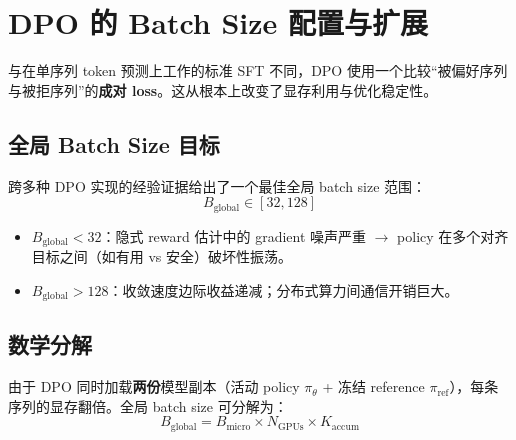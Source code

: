 \section{DPO 的 Batch Size 配置与扩展}
\label{dpo-batch-size-configuration-and-scaling}

与在单序列 token 预测上工作的标准 SFT 不同，DPO 使用一个比较“被偏好序列与被拒序列”的\textbf{成对 loss}。这从根本上改变了显存利用与优化稳定性。

\subsection{全局 Batch Size 目标}
\label{global-batch-size-target}

跨多种 DPO 实现的经验证据给出了一个最佳全局 batch size 范围：
\begin{equation}
\boxed{B_{\text{global}} \in [32, 128]}
\end{equation}

\begin{itemize}
  \item $B_{\text{global}} < 32$：隐式 reward 估计中的 gradient 噪声严重 $\rightarrow$ policy 在多个对齐目标之间（如有用 vs 安全）破坏性振荡。
  \item $B_{\text{global}} > 128$：收敛速度边际收益递减；分布式算力间通信开销巨大。
\end{itemize}

\subsection{数学分解}
\label{mathematical-decomposition}

由于 DPO 同时加载\textbf{两份}模型副本（活动 policy $\pi_\theta$ + 冻结 reference $\pi_{\text{ref}}$），每条序列的显存翻倍。全局 batch size 可分解为：
\begin{equation}
\boxed{B_{\text{global}} = B_{\text{micro}} \times N_{\text{GPUs}} \times K_{\text{accum}}}
\end{equation}

